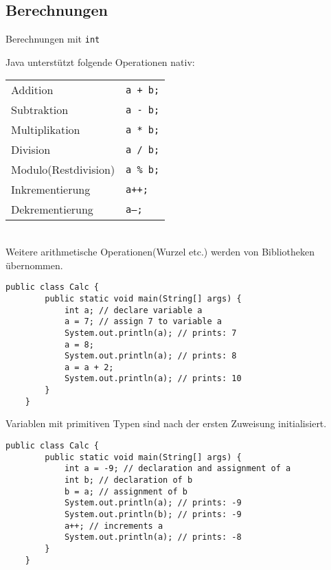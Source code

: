 \subsection{Berechnungen}

\begin{frame}{Berechnungen mit \texttt{int}}

    Java unterstützt folgende Operationen nativ: \\
    \smallskip
	\begin{tabular}{ll}
		Addition & \texttt{a + b;} \\
		Subtraktion & \texttt{a - b;} \\
		Multiplikation &\texttt{a * b;} \\
		Division & \texttt{a / b;} \\
        Modulo(Restdivision) & \texttt{a \% b;} \\
		Inkrementierung & \texttt{a++;} \\
		Dekrementierung & \texttt{a--;} \\
	\end{tabular} \\
    \smallskip
    Weitere arithmetische Operationen(Wurzel etc.) werden von Bibliotheken übernommen.
\framebreak
	\begin{lstlisting}[gobble=4]
	public class Calc {
	    public static void main(String[] args) {
	        int a; // declare variable a
	        a = 7; // assign 7 to variable a
	        System.out.println(a); // prints: 7
	        a = 8;
	        System.out.println(a); // prints: 8
	        a = a + 2;
	        System.out.println(a); // prints: 10
	    }
	}\end{lstlisting}
    Variablen mit primitiven Typen sind nach der ersten Zuweisung initialisiert.	
\framebreak
	\begin{lstlisting}[gobble=4]
	public class Calc {
	    public static void main(String[] args) {
	        int a = -9; // declaration and assignment of a
	        int b; // declaration of b
	        b = a; // assignment of b
	        System.out.println(a); // prints: -9
	        System.out.println(b); // prints: -9
	        a++; // increments a
	        System.out.println(a); // prints: -8
	    }
	}\end{lstlisting}
\end{frame}

